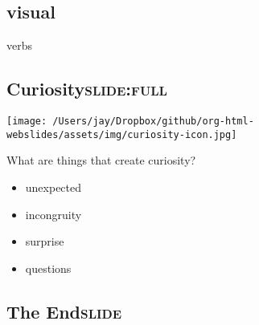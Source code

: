 \documentclass[12pt]{article}
\begin{document}
\subsection{visual}
\label{sec:org09bb31d}
verbs

\subsection[Curiosity]{Curiosity\hfill{}\textsc{slide:full}}
\label{sec:orgfdefea1}
\begin{center}
\texttt{[image: /Users/jay/Dropbox/github/org-html-webslides/assets/img/curiosity-icon.jpg]}
\end{center}


What are things that create curiosity?

\begin{itemize}
\item unexpected
\item incongruity
\item surprise
\item questions
\end{itemize}

\subsection[The End]{The End\hfill{}\textsc{slide}}
\label{sec:orgd4c54b4}
\end{document}
